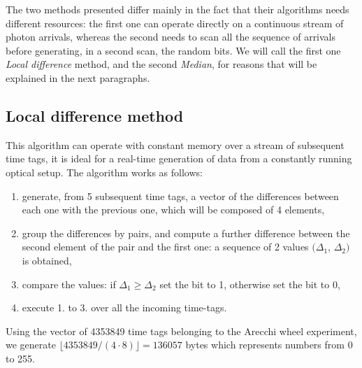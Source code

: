 \documentclass[10pt, final]{article}
\begin{document}
\begin{multicols}{2}
 The two methods presented differ mainly in the fact that their algorithms needs different resources: the first one can operate directly on a continuous stream of photon arrivals, whereas the second needs to scan all the sequence of arrivals before generating, in a second scan, the random bits. We will call the first one \emph{Local difference} method, and the second \emph{Median}, for reasons that will be explained in the next paragraphs.
\subsection*{Local difference method}
This algorithm can operate with constant memory over a stream of subsequent time tags, it is ideal for a real-time generation of data from a constantly running optical setup.
The algorithm works as follows:
\begin{enumerate}
    \item generate, from 5 subsequent time tags, a vector of the differences between each one with the previous one, which will be composed of 4 elements, 
    \item group the differences by pairs, and compute a further  difference between the second element of the pair and the first one: a sequence of 2 values $(\Delta_1$, $\Delta_2)$ is obtained,
    \item compare the values: if $\Delta_1 \geq \Delta_2$ set the bit to 1, otherwise set the bit to 0, 
    \item execute 1. to 3. over all the incoming time-tags.
\end{enumerate}
Using the vector of 4353849 time tags belonging to the Arecchi wheel experiment, we generate $\lfloor4353849/(4\cdot 8)\rfloor = 136057$ bytes which represents numbers from 0 to 255.


\end{multicols}
\end{document}
